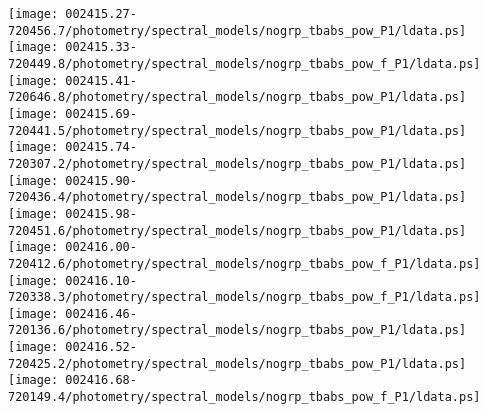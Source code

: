 \documentclass{aastex}
\begin{document}
\begin{figure*}[!ht]
\centering
\texttt{[image: 002415.27-720456.7/photometry/spectral\_models/nogrp\_tbabs\_pow\_P1/ldata.ps]} \hfill 
\texttt{[image: 002415.33-720449.8/photometry/spectral\_models/nogrp\_tbabs\_pow\_f\_P1/ldata.ps]} \hfill 
\texttt{[image: 002415.41-720646.8/photometry/spectral\_models/nogrp\_tbabs\_pow\_P1/ldata.ps]} \\ 
\vspace*{0.5in}
\texttt{[image: 002415.69-720441.5/photometry/spectral\_models/nogrp\_tbabs\_pow\_P1/ldata.ps]} \hfill 
\texttt{[image: 002415.74-720307.2/photometry/spectral\_models/nogrp\_tbabs\_pow\_P1/ldata.ps]} \hfill 
\texttt{[image: 002415.90-720436.4/photometry/spectral\_models/nogrp\_tbabs\_pow\_P1/ldata.ps]} \\ 
\vspace*{0.5in}
\texttt{[image: 002415.98-720451.6/photometry/spectral\_models/nogrp\_tbabs\_pow\_P1/ldata.ps]} \hfill 
\texttt{[image: 002416.00-720412.6/photometry/spectral\_models/nogrp\_tbabs\_pow\_f\_P1/ldata.ps]} \hfill 
\texttt{[image: 002416.10-720338.3/photometry/spectral\_models/nogrp\_tbabs\_pow\_f\_P1/ldata.ps]} \\ 
\vspace*{0.5in}
\texttt{[image: 002416.46-720136.6/photometry/spectral\_models/nogrp\_tbabs\_pow\_P1/ldata.ps]} \hfill 
\texttt{[image: 002416.52-720425.2/photometry/spectral\_models/nogrp\_tbabs\_pow\_P1/ldata.ps]} \hfill 
\texttt{[image: 002416.68-720149.4/photometry/spectral\_models/nogrp\_tbabs\_pow\_f\_P1/ldata.ps]} \\ 
\vspace*{0.5in}
\end{figure*}
\clearpage
\end{document}
